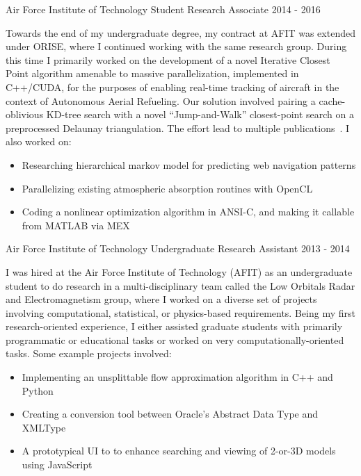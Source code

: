 \documentclass[11pt,a4paper,sans]{moderncv} %
\begin{document}
			 {Air Force Institute of Technology}
			 {Student Research Associate}
			 {2014 - 2016}{}{\vspace{3pt}
Towards the end of my undergraduate degree, my contract at AFIT was extended under ORISE, where I continued working with the same research group. 
During this time I primarily worked on the development of a novel Iterative Closest Point algorithm amenable to massive parallelization, implemented in C++/CUDA, for the purposes of enabling real-time tracking of aircraft in the context of Autonomous Aerial Refueling. Our solution involved pairing a cache-oblivious KD-tree search with a novel ``Jump-and-Walk'' closest-point search on a preprocessed Delaunay triangulation. The effort lead to multiple publications~\cite{piekenbrock2016automated, robinson2016parallelized}. I also worked on:
\begin{itemize}
	\item Researching hierarchical markov model for predicting web navigation patterns 
	\item Parallelizing existing atmospheric absorption routines with OpenCL 
	\item Coding a nonlinear optimization algorithm in ANSI-C, and making it callable from MATLAB via MEX
\end{itemize}
}
\vspace{0.75em}
			 {Air Force Institute of Technology}
			 {Undergraduate Research Assistant}
			 {2013 - 2014}{}{\vspace{3pt}
I was hired at the Air Force Institute of Technology (AFIT) as an undergraduate student to do research in a multi-disciplinary team called the Low Orbitals Radar and Electromagnetism group, where I worked on a diverse set of projects involving computational, statistical, or physics-based requirements. Being my first research-oriented experience, I either assisted graduate students with primarily programmatic or educational tasks or worked on very computationally-oriented tasks. Some example projects involved: 
\begin{itemize}
	\item Implementing an unsplittable flow approximation algorithm in C++ and Python
	\item Creating a conversion tool between Oracle's Abstract Data Type and XMLType
	\item A prototypical UI to to enhance searching and viewing of 2-or-3D models using JavaScript
\end{itemize}	
}
\end{document}
